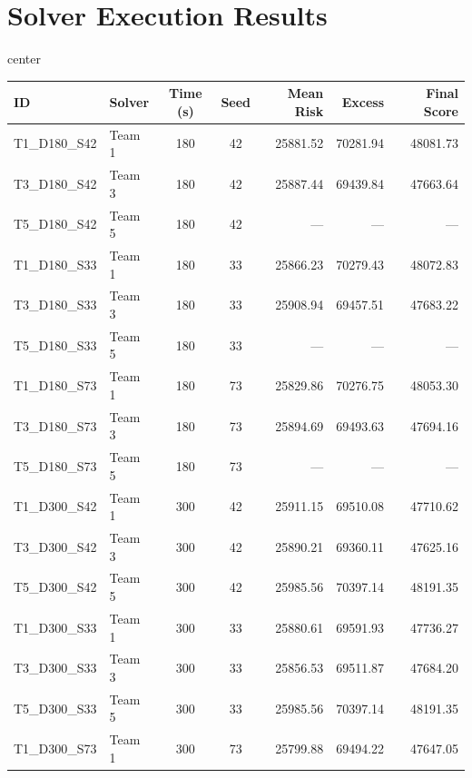 \section{Solver Execution Results}
\label{app:solver_results}
{\centering
	\scriptsize
	\renewcommand{\arraystretch}{0.75}
	\label{tab:solver_results}
	\begin{adjustbox}{center}
		\begin{tabular}{llccrrr}
			\toprule
\textbf{ID} & \textbf{Solver} & \textbf{Time (s)} & \textbf{Seed} & \textbf{Mean Risk} & \textbf{Excess} & \textbf{Final Score} \\
			\midrule
T1\_D180\_S42 & Team 1 & 180 & 42 & 25881.52 & 70281.94 & 48081.73 \\
T3\_D180\_S42 & Team 3 & 180 & 42 & 25887.44 & 69439.84 & 47663.64 \\
T5\_D180\_S42 & Team 5 & 180 & 42 & --- & --- & --- \\
			\midrule
T1\_D180\_S33 & Team 1 & 180 & 33 & 25866.23 & 70279.43 & 48072.83 \\
T3\_D180\_S33 & Team 3 & 180 & 33 & 25908.94 & 69457.51 & 47683.22 \\
T5\_D180\_S33 & Team 5 & 180 & 33 & --- & --- & --- \\
			\midrule
T1\_D180\_S73 & Team 1 & 180 & 73 & 25829.86 & 70276.75 & 48053.30 \\
T3\_D180\_S73 & Team 3 & 180 & 73 & 25894.69 & 69493.63 & 47694.16 \\
T5\_D180\_S73 & Team 5 & 180 & 73 & --- & --- & --- \\
			\midrule
T1\_D300\_S42 & Team 1 & 300 & 42 & 25911.15 & 69510.08 & 47710.62 \\
T3\_D300\_S42 & Team 3 & 300 & 42 & 25890.21 & 69360.11 & 47625.16 \\
T5\_D300\_S42 & Team 5 & 300 & 42 & 25985.56 & 70397.14 & 48191.35 \\
			\midrule
T1\_D300\_S33 & Team 1 & 300 & 33 & 25880.61 & 69591.93 & 47736.27 \\
T3\_D300\_S33 & Team 3 & 300 & 33 & 25856.53 & 69511.87 & 47684.20 \\
T5\_D300\_S33 & Team 5 & 300 & 33 & 25985.56 & 70397.14 & 48191.35 \\
			\midrule
T1\_D300\_S73 & Team 1 & 300 & 73 & 25799.88 & 69494.22 & 47647.05 \\

\end{tabular}
\end{adjustbox}}
